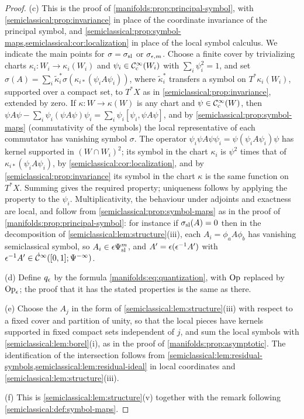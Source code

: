 \begin{proof}
  (c) This is the proof of \cref{manifolds:prop:principal-symbol}, with
  \cref{semiclassical:prop:invariance} in place of the coordinate invariance of
  the principal symbol, and \cref{semiclassical:prop:symbol-maps,semiclassical:cor:localization}
  in place of the local symbol calculus. We indicate the main points for
  $\sigma=\sigma_{\mathrm{sl}}$ or $\sigma_{\epsilon,m}$. Choose a finite cover by trivializing charts
  $\kappa_i:W_i\to\kappa_i(W_i)$ and $\psi_i\in\mathcal{C}^\infty_{\mathrm{c}}(W_i)$ with $\sum_i\psi_i^2=1$, and
  set $\sigma(A)=\sum_i\tilde\kappa_i^*\sigma(\kappa_{i*}(\psi_iA\psi_i))$, where
  $\tilde\kappa_i^*$ transfers a symbol on $T^*\kappa_i(W_i)$, supported over a compact
  set, to $T^*X$ as in \cref{semiclassical:prop:invariance}, extended by zero. If
  $\kappa:W\to\kappa(W)$ is any chart and $\psi\in\mathcal{C}^\infty_{\mathrm{c}}(W)$, then
  $\psi A\psi-\sum_i\psi_i(\psi A\psi)\psi_i=\sum_i\psi_i[\psi_i,\psi A\psi]$, and by
  \cref{semiclassical:prop:symbol-maps} (commutativity of the symbols) the local
  representative of each commutator has vanishing symbol $\sigma$. The operator
  $\psi_i\psi A\psi\psi_i=\psi(\psi_iA\psi_i)\psi$ has kernel supported in
  $(W\cap W_i)^2$; its symbol in the chart $\kappa_i$ is $\psi^2$ times that of
  $\kappa_{i*}(\psi_iA\psi_i)$, by \cref{semiclassical:cor:localization}, and by
  \cref{semiclassical:prop:invariance} its symbol in the chart $\kappa$ is the same
  function on $T^*X$. Summing gives the required property; uniqueness follows by
  applying the property to the $\psi_i$. Multiplicativity, the behaviour under
  adjoints and exactness are local, and follow from
  \cref{semiclassical:prop:symbol-maps} as in the proof of
  \cref{manifolds:prop:principal-symbol}: for instance if $\sigma_{\mathrm{sl}}(A)=0$ then in the
  decomposition of \cref{semiclassical:lem:structure}(iii), each $A_i=\phi_aA\phi_b$ has
  vanishing semiclassical symbol, so $A_i\in\epsilon\Psi^{m}_{\mathrm{sl}}$, and $A'=\epsilon(\epsilon^{-1}A')$ with
  $\epsilon^{-1}A'\in\dot{\mathcal{C}}^\infty([0,1];\Psi^{-\infty})$.

  (d) Define $q_\epsilon$ by the formula \eqref{manifolds:eq:quantization}, with $\operatorname{Op}$
  replaced by $\operatorname{Op}_\epsilon$; the proof that it has the stated properties is the same
  as there.

  (e) Choose the $A_j$ in the form of \cref{semiclassical:lem:structure}(iii) with
  respect to a fixed cover and partition of unity, so that the local pieces have
  kernels supported in fixed compact sets independent of $j$, and sum the local
  symbols with \cref{semiclassical:lem:borel}(i), as in the proof of
  \cref{manifolds:prop:asymptotic}. The identification of the intersection follows
  from \cref{semiclassical:lem:residual-symbols,semiclassical:lem:residual-ideal}
  in local coordinates and \cref{semiclassical:lem:structure}(iii).

  (f) This is \cref{semiclassical:lem:structure}(v) together with the remark
  following \cref{semiclassical:def:symbol-maps}.
\end{proof}

